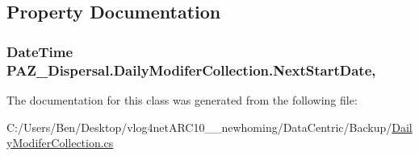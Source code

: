 \subsection{Property Documentation}
\hypertarget{class_p_a_z___dispersal_1_1_daily_modifer_collection_a757d6c82a5c58468f3d72c4e27e434e8}{
\subsubsection[{Next\-Start\-Date}]{\setlength{\rightskip}{0pt plus 5cm}Date\-Time P\-A\-Z\-\_\-\-Dispersal.\-Daily\-Modifer\-Collection.\-Next\-Start\-Date\hspace{0.3cm}{\ttfamily [get]}, {\ttfamily [set]}}}\label{class_p_a_z___dispersal_1_1_daily_modifer_collection_a757d6c82a5c58468f3d72c4e27e434e8}


The documentation for this class was generated from the following file\-:\begin{DoxyCompactItemize}
\item 
C\-:/\-Users/\-Ben/\-Desktop/vlog4net\-A\-R\-C10\-\_\-\_\-newhoming/\-Data\-Centric/\-Backup/\hyperlink{_backup_2_daily_modifer_collection_8cs}{Daily\-Modifer\-Collection.\-cs}\end{DoxyCompactItemize}
